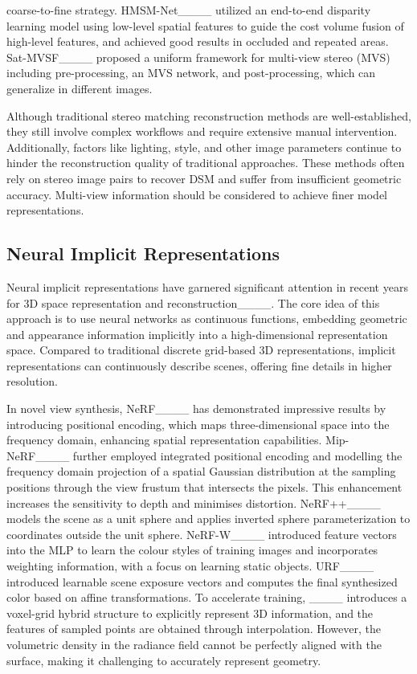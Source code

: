 coarse-to-fine strategy. HMSM-Net____ utilized an end-to-end disparity learning model using low-level spatial features to guide the cost volume fusion of high-level features, and achieved good results in occluded and repeated areas. Sat-MVSF____ proposed a uniform framework for multi-view stereo (MVS) including pre-processing, an MVS network, and post-processing, which can generalize in different images.

Although traditional stereo matching reconstruction methods are well-established, they still involve complex workflows and require extensive manual intervention. Additionally, factors like lighting, style, and other image parameters continue to hinder the reconstruction quality of traditional approaches. These methods often rely on stereo image pairs to recover DSM and suffer from insufficient geometric accuracy. Multi-view information should be considered to achieve finer model representations.

\subsection{Neural Implicit Representations}
Neural implicit representations have garnered significant attention in recent years for 3D space representation and reconstruction____. The core idea of this approach is to use neural networks as continuous functions, embedding geometric and appearance information implicitly into a high-dimensional representation space. Compared to traditional discrete grid-based 3D representations, implicit representations can continuously describe scenes, offering fine details in higher resolution.

In novel view synthesis, NeRF____ has demonstrated impressive results by introducing positional encoding, which maps three-dimensional space into the frequency domain, enhancing spatial representation capabilities. Mip-NeRF____ further employed integrated positional encoding and modelling the frequency domain projection of a spatial Gaussian distribution at the sampling positions through the view frustum that intersects the pixels. This enhancement increases the sensitivity to depth and minimises distortion. NeRF++____ models the scene as a unit sphere and applies inverted sphere parameterization to coordinates outside the unit sphere. NeRF-W____ introduced feature vectors into the MLP to learn the colour styles of training images and incorporates weighting information, with a focus on learning static objects. URF____ introduced learnable scene exposure vectors and computes the final synthesized color based on affine transformations. To accelerate training, ____ introduces a voxel-grid hybrid structure to explicitly represent 3D information, and the features of sampled points are obtained through interpolation. However, the volumetric density in the radiance field cannot be perfectly aligned with the surface, making it challenging to accurately represent geometry.

